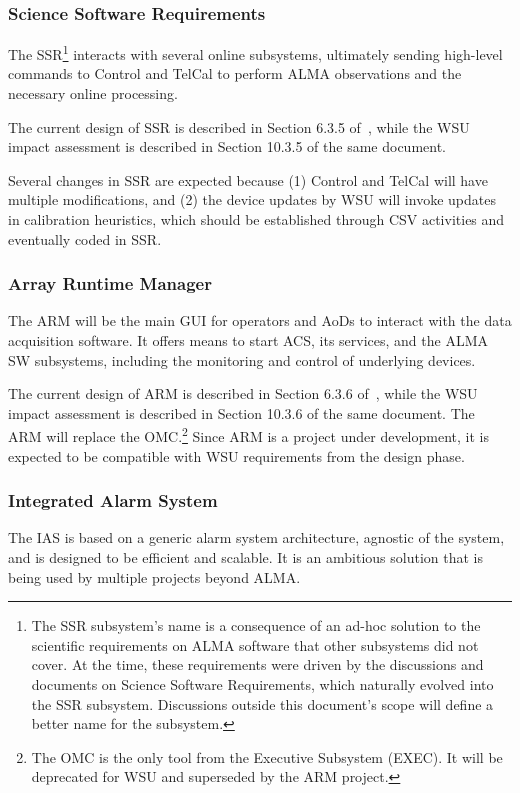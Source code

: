 \subsubsection{Science Software Requirements}
The SSR\footnote{The SSR subsystem's name is a consequence of an ad-hoc solution to the scientific requirements on ALMA software that other subsystems did not cover. At the time, these requirements were driven by the discussions and documents on Science Software Requirements, which naturally evolved into the SSR subsystem. Discussions outside this document's scope will define a better name for the subsystem.} interacts with several online subsystems, ultimately sending high-level commands to Control and TelCal to perform ALMA observations and the necessary online processing.

The current design of SSR is described in Section 6.3.5 of~\cite{CSA-IA}, while the WSU impact assessment is described in Section 10.3.5 of the same document.

Several changes in SSR are expected because (1) Control and TelCal will have multiple modifications, and (2) the device updates by WSU will invoke updates in calibration heuristics, which should be established through \ac{CSV} activities and eventually coded in SSR.


\subsubsection{Array Runtime Manager}
\label{sec:arm}
The \ac{ARM} will be the main GUI for operators and AoDs to interact with the data acquisition software. It offers means to start ACS, its services, and the ALMA SW subsystems, including the monitoring and control of underlying devices.

The current design of \ac{ARM} is described in Section 6.3.6 of~\cite{CSA-IA}, while the WSU impact assessment is described in Section 10.3.6 of the same document.
The \ac{ARM} will replace the OMC.\footnote{The OMC is the only tool from the Executive Subsystem (EXEC). It will be deprecated for WSU and superseded by the \ac{ARM} project.}
Since \ac{ARM} is a project under development, it is expected to be compatible with WSU requirements from the design phase.


\subsubsection{Integrated Alarm System}
\label{sec:ias}
The \ac{IAS} is based on a generic alarm system architecture, agnostic of the system, and is designed to be efficient and scalable. It is an ambitious solution that is being used by multiple projects beyond ALMA.

